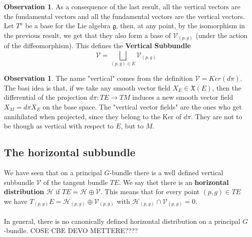 \documentclass[12pt,a4paper]{report}
\theoremstyle{definition}
\theoremstyle{Theorem}
\theoremstyle{definition}
\theoremstyle{definition}
\newtheorem{Obs}[Def]{Observation}
\begin{document}
		\begin{Obs}
			As a consequence of the last result, all the vertical vectors are the fundamental vectors and all the fundamental vectors are the vertical vectors.\\
			Let $T^a$ be a base for the Lie algebra $\mathfrak{g}$, then, at any point, by the isomorphism in the previous result, we get that they also form a base of $\mathcal{V}_{(p,g)}$ (under the action of the diffeomorphism). This defines the \textbf{Vertical Subbundle} $$\mathcal{V}=\bigsqcup_{(p,g)\in E}\mathcal{V}_{(p,g)}$$
		\end{Obs}
		\begin{Obs}
			The name "vertical" comes from the definition $\mathcal{V}=Ker(d\pi)$. The basi idea is that, if we take any smooth vector field $X_E\in\mathfrak{X}(E)$, then the differential of the projection $d\pi:TE\rightarrow TM$ induces a new smooth vector field $X_M=d\pi X_E$ on the base space. The "vertical vector fields" are the ones who get annihilated when projected, since they belong to the Ker of $d\pi$. They are not to be though as vertical with respect to $E$, but to $M$.
		\end{Obs}
		\subsection{The horizontal subbundle}
		We have seen that on a principal $G$-bundle there is a well defined vertical subbundle $\mathcal{V}$ of the tangent bundle $TE$. We say thet there is an \textbf{horizontal distribution} $\mathcal{H}$ if $TE=\mathcal{H}\oplus\mathcal{V}$. This means that for every point $(p,g)\in TE$ we have $T_{(p,g)}E=\mathcal{H}_{(p,g)}\oplus\mathcal{V}_{(p,g)}$ with $\mathcal{H}_{(p,g)}\cap\mathcal{V}_{(p,g)}=0$.\\
		\\
		In general, there is no canonically defined horizontal distribution on a principal $G$-bundle.
		COSE CBE DEVO METTERE????
\end{document}
